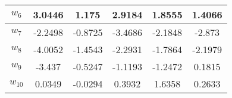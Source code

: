 \begin{table}[h]
\begin{tabular}{cccccc}
\multicolumn{1}{|c|}{\textbf{$w_6$}} & \multicolumn{1}{c|}{3.0446} & \multicolumn{1}{c|}{1.175} & \multicolumn{1}{c|}{2.9184} & \multicolumn{1}{c|}{1.8555} & \multicolumn{1}{c|}{1.4066} \\ \hline
\multicolumn{1}{|c|}{\textbf{$w_7$}} & \multicolumn{1}{c|}{-2.2498} & \multicolumn{1}{c|}{-0.8725} & \multicolumn{1}{c|}{-3.4686} & \multicolumn{1}{c|}{-2.1848} & \multicolumn{1}{c|}{-2.873} \\ \hline
\multicolumn{1}{|c|}{\textbf{$w_8$}} & \multicolumn{1}{c|}{-4.0052} & \multicolumn{1}{c|}{-1.4543} & \multicolumn{1}{c|}{-2.2931} & \multicolumn{1}{c|}{-1.7864} & \multicolumn{1}{c|}{-2.1979} \\ \hline
\multicolumn{1}{|c|}{\textbf{$w_9$}} & \multicolumn{1}{c|}{-3.437} & \multicolumn{1}{c|}{-0.5247} & \multicolumn{1}{c|}{-1.1193} & \multicolumn{1}{c|}{-1.2472} & \multicolumn{1}{c|}{0.1815} \\ \hline
\multicolumn{1}{|c|}{\textbf{$w_{10}$}} & \multicolumn{1}{c|}{0.0349} & \multicolumn{1}{c|}{-0.0294} & \multicolumn{1}{c|}{0.3932} & \multicolumn{1}{c|}{1.6358} & \multicolumn{1}{c|}{0.2633} \\ \hline
\end{tabular}
\end{table}